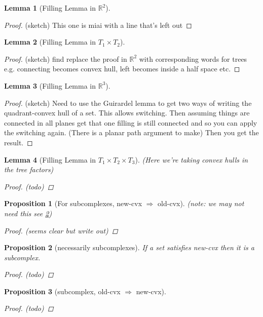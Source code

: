 \documentclass{article}
\theoremstyle{mystyle}
\newtheorem{lem}{Lemma}[section]
\newtheorem{pro}{Proposition}
\theoremstyle{remark}
\begin{document}
\begin{lem}
    [Filling Lemma in \(\mathbb{R}^{2}\)]
\end{lem}
\begin{proof}
    (sketch) This one is miai with a line that's left out
\end{proof}
\begin{lem}
    [Filling Lemma in \(T_{1} \times T_{2}\)]
\end{lem}
\begin{proof}
    (sketch) find replace the proof in \(\mathbb{R}^{2}\) with corresponding words for trees e.g. connecting becomes convex hull, left becomes inside a half space etc.
\end{proof}
\begin{lem}
    [Filling Lemma in \(\mathbb{R}^{3}\)]
\end{lem}
\begin{proof}
    (sketch) Need to use the Guirardel lemma to get two ways of writing the quadrant-convex hull of a set. This allows switching. Then assuming things are connected in all planes get that one filling is still connected and so you can apply the switching again. (There is a planar path argument to make) Then you get the result.
\end{proof}
\begin{lem}
    [Filling Lemma in \(T_{1} \times T_{2} \times T_{3}\)]
    (Here we're taking convex hulls in the tree factors)
\begin{proof}
    (todo)
\end{proof}
\end{lem}
\begin{pro}
    [For subcomplexes, new-cvx \(\Longrightarrow\) old-cvx]
    (note: we may not need this see \ref{label1})
    \begin{proof}
        (seems clear but write out)
    \end{proof}
\end{pro}
\begin{pro}
    [necessarily subcomplexes]
    \label{label1}
    If a set satisfies new-cvx then it is a subcomplex.
    \begin{proof}
        (todo)
    \end{proof}
\end{pro}
\begin{pro}
    [subcomplex, old-cvx \(\Longrightarrow\) new-cvx]
    \begin{proof}
        (todo)
    \end{proof}
\end{pro}
\end{document}
